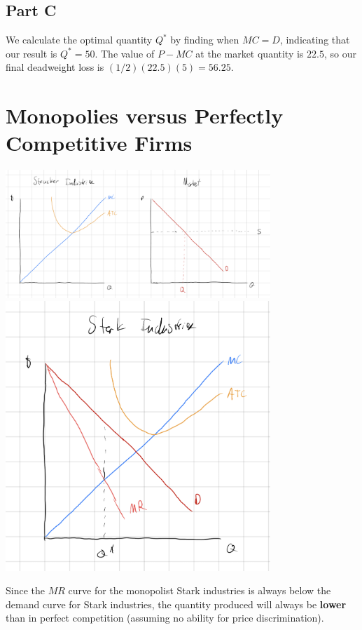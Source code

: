 \documentclass[8pt]{extarticle}
\begin{document}
{\subsection*{Part C}
We calculate the optimal quantity $Q^{*}$ by finding when $MC = D$, indicating that our result is $Q^{*} = 50$. The value of $P - MC$ at the market quantity is $22.5$, so our final deadweight loss is $(1/2)(22.5)(5) = 56.25$.
\section*{Monopolies versus Perfectly Competitive Firms}
\begin{center}
	\includegraphics[width=10cm]{HW10Q3A}\\
	\includegraphics[width=10cm]{HW10Q3B}
\end{center}
Since the $MR$ curve for the monopolist Stark industries is always below the demand curve for Stark industries, the quantity produced will always be \textbf{lower} than in perfect competition (assuming no ability for price discrimination).
}
\end{document}
